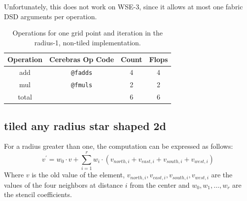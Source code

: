 \documentclass{article}
\begin{document}
Unfortunately, this does not work on WSE-3, since it allows at most one fabric DSD arguments per operation.

\begin{table}[h]
    \centering
    \begin{tabular}{|c|c|c|c|}
        \hline
        Operation & Cerebras Op Code & Count & Flops \\
        \hline
        add & \texttt{@fadds} & 4 & 4 \\
        mul & \texttt{@fmuls} & 2 & 2 \\
        \hline
        total & & 6 & 6 \\
        \hline
    \end{tabular}
    \caption{Operations for one grid point and iteration in the radius-1, non-tiled implementation.}
    \label{tab:r1_non_tiled_operations}
\end{table}


\subsection{tiled any radius star shaped 2d}
For a radius greater than one, the computation can be expressed as follows:
\begin{equation}
    \label{eq:stencil_computation_tiled}
    v^{'} = w_0 \cdot v + \sum_{i=1}^{r} w_i \cdot (v_{north,i} + v_{east,i} + v_{south,i} + v_{west,i})
\end{equation}
Where $v$ is the old value of the element, $v_{north,i}, v_{east,i}, v_{south,i}, v_{west,i}$ are the values of the four neighbors at distance $i$ from the center and $w_0, w_1, \dots, w_r$ are the stencil coefficients.
\end{document}
